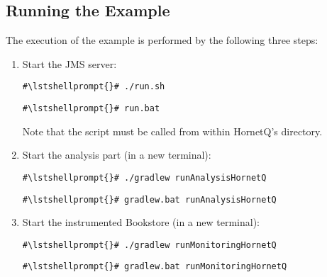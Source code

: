 \setPropertiesListing


\subsection{Running the Example}

 The execution of the example is performed by the following three steps:
\begin{enumerate}
\item Start the JMS server:

\setBashListing
\begin{lstlisting}[caption=Start of the JMS server under UNIX-like systems]
#\lstshellprompt{}# ./run.sh
\end{lstlisting}
\begin{lstlisting}[caption=Start of the JMS server under Windows]
#\lstshellprompt{}# run.bat
\end{lstlisting}

Note that the script must be called from within HornetQ's  directory.

\item Start the analysis part (in a new terminal):
\setBashListing
\begin{lstlisting}[caption=Start the analysis part under UNIX-like systems]
#\lstshellprompt{}# ./gradlew runAnalysisHornetQ
\end{lstlisting}
\begin{lstlisting}[caption=Start the analysis part under Windows]
#\lstshellprompt{}# gradlew.bat runAnalysisHornetQ
\end{lstlisting}
\item Start the instrumented Bookstore (in a new terminal):
\setBashListing
\begin{lstlisting}[caption=Start the analysis part under UNIX-like systems]
#\lstshellprompt{}# ./gradlew runMonitoringHornetQ
\end{lstlisting}
\begin{lstlisting}[caption=Start the analysis part under Windows]
#\lstshellprompt{}# gradlew.bat runMonitoringHornetQ
\end{lstlisting}
\end{enumerate}

